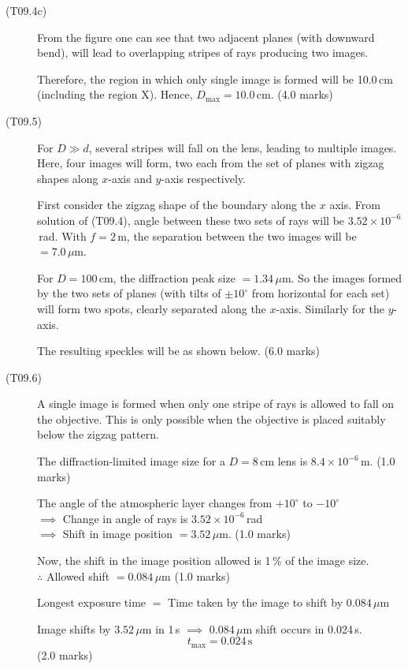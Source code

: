 \begin{description}
\item[(T09.4c)]
From the figure one can see that two adjacent planes (with downward bend),
will lead to overlapping stripes of rays producing two images.

Therefore, the region in which only single image is formed will be 10.0\,cm
(including the region X). Hence, $D_{\mathrm{max}} = 10.0$\,cm.
\hfill(4.0 marks)

\item[(T09.5)]
For $D \gg d$, several stripes will fall on the lens, leading to multiple
images. Here, four images will form, two each from the set of planes with
zigzag shapes along $x$-axis and $y$-axis respectively.

First consider the zigzag shape of the boundary along the $x$ axis. From
solution of (T09.4), angle between these two sets of rays will be
$3.52 \times 10^{-6}$\,rad. With $f = 2$\,m, the separation between the two
images will be $= 7.0\,\mu\mathrm{m}$.

For $D = 100$\,cm, the diffraction peak size $= 1.34\,\mu\mathrm{m}$. So
the images formed by the two sets of planes (with tilts of $\pm 10^\circ$
from horizontal for each set) will form two spots, clearly separated along
the $x$-axis. Similarly for the $y$-axis.

The resulting speckles will be as shown below. \hfill(6.0 marks)

\item[(T09.6)]
A single image is formed when only one stripe of rays is allowed to fall on
the objective. This is only possible when the objective is placed suitably
below the zigzag pattern.

The diffraction-limited image size for a $D = 8$\,cm lens is
$8.4 \times 10^{-6}$\,m. \hfill(1.0 marks)

The angle of the atmospheric layer changes from $+10^\circ$ to $-10^\circ$\\
$\implies$ Change in angle of rays is $3.52 \times 10^{-6}$\,rad\\
$\implies$ Shift in image position $= 3.52\,\mu\mathrm{m}$.
\hfill(1.0 marks)

Now, the shift in the image position allowed is 1\,\% of the image size.\\
$\therefore$ Allowed shift $= 0.084\,\mu\mathrm{m}$ \hfill(1.0 marks)

Longest exposure time $=$ Time taken by the image to shift by
$0.084\,\mu\mathrm{m}$

Image shifts by $3.52\,\mu\mathrm{m}$ in 1\,s $\implies$
$0.084\,\mu\mathrm{m}$ shift occurs in 0.024\,s.
\[ t_{\mathrm{max}} = 0.024\,\mathrm{s} \]
\hfill(2.0 marks)
\end{description}
